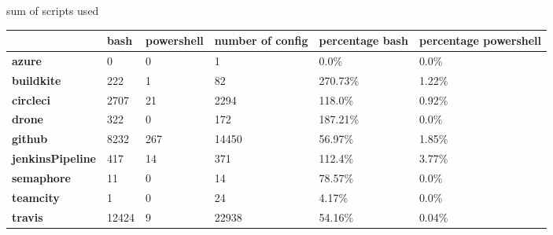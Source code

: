 

\caption{sum of scripts used}
\label{table:scripts used}
\begin{tabular}{|l|l|l|l|l|l|}
\hline
{} &   bash &  powershell &  number of config & percentage bash & percentage powershell \\ \hline

\textbf{azure          } &      0 &           0 &                 1 &            0.0\% &                  0.0\% \\ \hline
\textbf{buildkite      } &    222 &           1 &                82 &         270.73\% &                 1.22\% \\ \hline
\textbf{circleci       } &   2707 &          21 &              2294 &          118.0\% &                 0.92\% \\ \hline
\textbf{drone          } &    322 &           0 &               172 &         187.21\% &                  0.0\% \\ \hline
\textbf{github         } &   8232 &         267 &             14450 &          56.97\% &                 1.85\% \\ \hline
\textbf{jenkinsPipeline} &    417 &          14 &               371 &          112.4\% &                 3.77\% \\ \hline
\textbf{semaphore      } &     11 &           0 &                14 &          78.57\% &                  0.0\% \\ \hline
\textbf{teamcity       } &      1 &           0 &                24 &           4.17\% &                  0.0\% \\ \hline
\textbf{travis         } &  12424 &           9 &             22938 &          54.16\% &                 0.04\% \\ \hline

\end{tabular}

